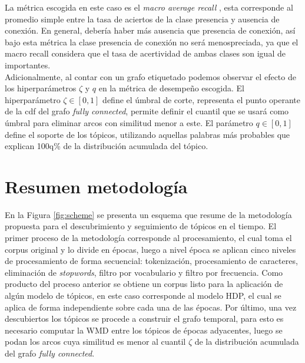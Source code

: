 La métrica escogida en este caso es el \textit{macro average recall} \citep{forman2003extensive}, esta corresponde al promedio simple entre la tasa de aciertos de la clase presencia y ausencia de conexión. En general, debería haber más ausencia que presencia de conexión, así bajo esta métrica la clase presencia de conexión no será menospreciada, ya que el macro recall considera que el tasa de acertividad de ambas clases son igual de importantes.\\

Adicionalmente, al contar con un grafo etiquetado podemos observar el efecto de los hiperparámetros $\zeta$ y $q$ en la métrica de desempeño escogida. El hiperparámetro $\zeta\in[0,1]$ define el úmbral de corte, representa el punto operante de la cdf del grafo \textit{fully connected}, permite definir el cuantil que se usará como úmbral para eliminar arcos con similitud menor a este. El parámetro $q \in [0,1]$ define el soporte de los tópicos, utilizando aquellas palabras más probables que explican 100q\% de la distribución acumulada del tópico. 

\section{Resumen metodología}

En la Figura \ref{fig:scheme} se presenta un esquema que resume de la metodología propuesta para el descubrimiento y seguimiento de tópicos en el tiempo. El primer proceso de la metodología corresponde al procesamiento, el cual toma el corpus original y lo divide en épocas, luego a nivel época se aplican cinco niveles de procesamiento de forma secuencial: tokenización, procesamiento de caracteres, eliminación de \textit{stopwords}, filtro por vocabulario y filtro por frecuencia. Como producto del proceso anterior se obtiene un corpus listo para la aplicación de algún modelo de tópicos, en este caso corresponde al modelo HDP, el cual se aplica de forma independiente sobre cada una de las épocas. Por último, una vez descubiertos los tópicos se procede a construir el grafo temporal, para esto es necesario computar la WMD entre los tópicos de épocas adyacentes, luego se podan los arcos cuya similitud es menor al cuantil $\zeta$ de la distribución acumulada del grafo \textit{fully connected}.

\def\db[#1,#2,#3,#4,#5]#6{%
  \node[draw, cylinder, alias=cyl, shape border rotate=90, aspect=#3, %
  minimum height=#1, minimum width=#2, outer sep=-0.5, color=black] (#4) at #5 {};%
  \node at #5 {#6};%
}
\def\boxtext[#1,#2,#3,#4,#5]#6{
        \node[draw=black, rounded corners, minimum height=#1,minimum width=#2, text width=6em] (#4) at #5 {}; 
        \node[anchor=#3,inner sep=4pt,] at (#4.#3)  {#6};
}
\def\isaedge[#1,#2,#3,#4];{ 
  \draw[-triangle 60,color=black!20!black,#4,fill=white] (#1) -- #3
  (#2);  
}

